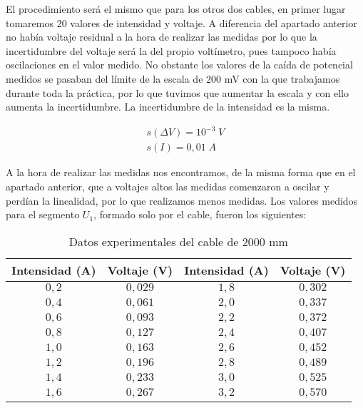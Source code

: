\documentclass[a4paper,12pt,titlepage]{article}
\begin{document}
El procedimiento será el mismo que para los otros dos cables, en primer lugar tomaremos 20 valores de intensidad y voltaje. A diferencia del apartado anterior no había voltaje residual a la hora de realizar las medidas por lo que la incertidumbre del voltaje será la del propio voltímetro, pues tampoco había oscilaciones en el valor medido. No obstante los valores de la caída de potencial medidos se pasaban del límite de la escala de 200 mV con la que trabajamos durante toda la práctica, por lo que tuvimos que aumentar la escala y con ello aumenta la incertidumbre. La incertidumbre de la intensidad es la misma.

\begin{equation}
    \begin{gathered}
        s(\Delta V) = 10^{-3} \; V \\
        s(I) = 0,01\; A
    \end{gathered}
\end{equation}

A la hora de realizar las medidas nos encontramos, de la misma forma que en el apartado anterior, que a voltajes altos las medidas comenzaron a oscilar y perdían la linealidad, por lo que realizamos menos medidas. Los valores medidos para el segmento $U_{1}$, formado solo por el cable, fueron los siguientes:

\begin{table}[h!]
    \centering
    \begin{tabular}{|c|c|c|c|}
        \hline
        Intensidad (A) & Voltaje (V) & Intensidad (A) & Voltaje (V) \\ \hline
        $0,2$ & $0,029$ & $1,8$ & $0,302$ \\ \hline
        $0,4$ & $0,061$ & $2,0$ & $0,337$ \\ \hline
        $0,6$ & $0,093$ & $2,2$ & $0,372$ \\ \hline
        $0,8$ & $0,127$ & $2,4$ & $0,407$ \\ \hline
        $1,0$ & $0,163$ & $2,6$ & $0,452$ \\ \hline
        $1,2$ & $0,196$ & $2,8$ & $0,489$ \\ \hline
        $1,4$ & $0,233$ & $3,0$ & $0,525$ \\ \hline
        $1,6$ & $0,267$ & $3,2$ & $0,570$ \\ \hline
    \end{tabular}
    \caption{Datos experimentales del cable de 2000 mm}
\end{table}
\end{document}
